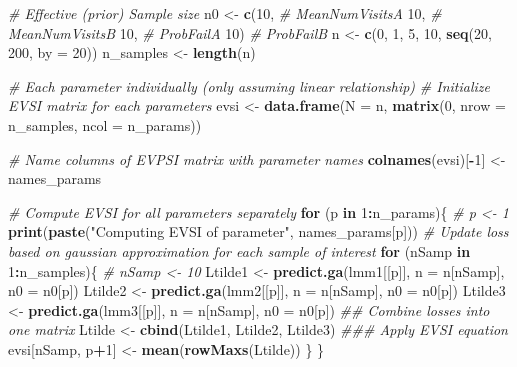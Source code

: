 \documentclass[
]{article}
\newenvironment{Shaded}{\begin{snugshade}}{\end{snugshade}}
\newcommand{\CommentTok}[1]{\textcolor[rgb]{0.56,0.35,0.01}{\textit{#1}}}
\newcommand{\ControlFlowTok}[1]{\textcolor[rgb]{0.13,0.29,0.53}{\textbf{#1}}}
\newcommand{\DataTypeTok}[1]{\textcolor[rgb]{0.13,0.29,0.53}{#1}}
\newcommand{\DecValTok}[1]{\textcolor[rgb]{0.00,0.00,0.81}{#1}}
\newcommand{\KeywordTok}[1]{\textcolor[rgb]{0.13,0.29,0.53}{\textbf{#1}}}
\newcommand{\NormalTok}[1]{#1}
\newcommand{\OperatorTok}[1]{\textcolor[rgb]{0.81,0.36,0.00}{\textbf{#1}}}
\newcommand{\StringTok}[1]{\textcolor[rgb]{0.31,0.60,0.02}{#1}}
\begin{document}
\begin{Shaded}
\begin{Highlighting}[]
\CommentTok{# Effective (prior) Sample size}
\NormalTok{n0 <-}\StringTok{ }\KeywordTok{c}\NormalTok{(}\DecValTok{10}\NormalTok{, }\CommentTok{# MeanNumVisitsA}
        \DecValTok{10}\NormalTok{, }\CommentTok{# MeanNumVisitsB}
        \DecValTok{10}\NormalTok{, }\CommentTok{# ProbFailA}
        \DecValTok{10}\NormalTok{) }\CommentTok{# ProbFailB}
\NormalTok{n <-}\StringTok{ }\KeywordTok{c}\NormalTok{(}\DecValTok{0}\NormalTok{, }\DecValTok{1}\NormalTok{, }\DecValTok{5}\NormalTok{, }\DecValTok{10}\NormalTok{, }\KeywordTok{seq}\NormalTok{(}\DecValTok{20}\NormalTok{, }\DecValTok{200}\NormalTok{, }\DataTypeTok{by =} \DecValTok{20}\NormalTok{))}
\NormalTok{n_samples <-}\StringTok{ }\KeywordTok{length}\NormalTok{(n)}

\CommentTok{# Each parameter individually (only assuming linear relationship)}
\CommentTok{# Initialize EVSI matrix for each parameters}
\NormalTok{evsi <-}\StringTok{ }\KeywordTok{data.frame}\NormalTok{(}\DataTypeTok{N =}\NormalTok{ n, }\KeywordTok{matrix}\NormalTok{(}\DecValTok{0}\NormalTok{, }\DataTypeTok{nrow =}\NormalTok{ n_samples, }\DataTypeTok{ncol =}\NormalTok{ n_params))}

\CommentTok{# Name columns of EVPSI matrix with parameter names}
\KeywordTok{colnames}\NormalTok{(evsi)[}\OperatorTok{-}\DecValTok{1}\NormalTok{] <-}\StringTok{ }\NormalTok{names_params}

\CommentTok{# Compute EVSI for all parameters separately}
\ControlFlowTok{for}\NormalTok{ (p }\ControlFlowTok{in} \DecValTok{1}\OperatorTok{:}\NormalTok{n_params)\{ }\CommentTok{# p <- 1}
  \KeywordTok{print}\NormalTok{(}\KeywordTok{paste}\NormalTok{(}\StringTok{"Computing EVSI of parameter"}\NormalTok{, names_params[p]))}
    \CommentTok{# Update loss based on gaussian approximation for each sample of interest}
    \ControlFlowTok{for}\NormalTok{ (nSamp }\ControlFlowTok{in} \DecValTok{1}\OperatorTok{:}\NormalTok{n_samples)\{ }\CommentTok{# nSamp <- 10}
\NormalTok{      Ltilde1 <-}\StringTok{ }\KeywordTok{predict.ga}\NormalTok{(lmm1[[p]], }\DataTypeTok{n =}\NormalTok{ n[nSamp], }\DataTypeTok{n0 =}\NormalTok{ n0[p])}
\NormalTok{      Ltilde2 <-}\StringTok{ }\KeywordTok{predict.ga}\NormalTok{(lmm2[[p]], }\DataTypeTok{n =}\NormalTok{ n[nSamp], }\DataTypeTok{n0 =}\NormalTok{ n0[p])}
\NormalTok{      Ltilde3 <-}\StringTok{ }\KeywordTok{predict.ga}\NormalTok{(lmm3[[p]], }\DataTypeTok{n =}\NormalTok{ n[nSamp], }\DataTypeTok{n0 =}\NormalTok{ n0[p])}
      \CommentTok{## Combine losses into one matrix}
\NormalTok{      Ltilde <-}\StringTok{ }\KeywordTok{cbind}\NormalTok{(Ltilde1, Ltilde2, Ltilde3)}
      \CommentTok{### Apply EVSI equation}
\NormalTok{      evsi[nSamp, p}\OperatorTok{+}\DecValTok{1}\NormalTok{] <-}\StringTok{ }\KeywordTok{mean}\NormalTok{(}\KeywordTok{rowMaxs}\NormalTok{(Ltilde))}
\NormalTok{    \}}
\NormalTok{\}}
\end{Highlighting}
\end{Shaded}
\end{document}
